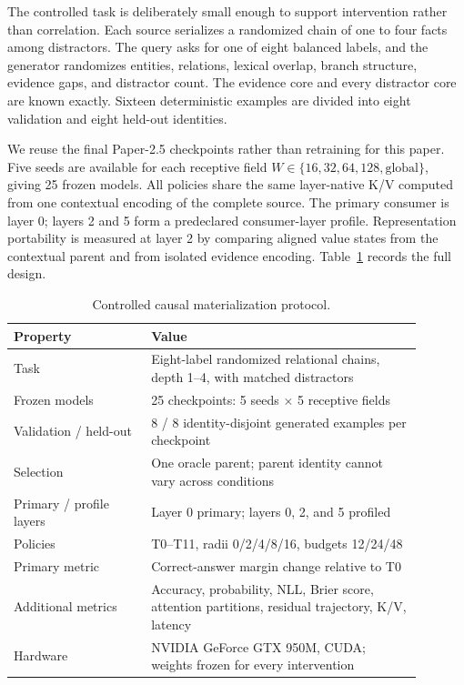 \documentclass[11pt]{article}
\begin{document}
The controlled task is deliberately small enough to support intervention rather than correlation.
Each source serializes a randomized chain of one to four facts among distractors.  The query asks
for one of eight balanced labels, and the generator randomizes entities, relations, lexical
overlap, branch structure, evidence gaps, and distractor count.  The evidence core and every
distractor core are known exactly.  Sixteen deterministic examples are divided into eight
validation and eight held-out identities.

We reuse the final Paper-2.5 checkpoints rather than retraining for this paper.  Five seeds are
available for each receptive field $W\in\{16,32,64,128,\mathrm{global}\}$, giving 25 frozen models.
All policies share the same layer-native K/V computed from one contextual encoding of the complete
source.  The primary consumer is layer 0; layers 2 and 5 form a predeclared consumer-layer profile.
Representation portability is measured at layer 2 by comparing aligned value states from the
contextual parent and from isolated evidence encoding.  Table~\ref{tab:protocol} records the full
design.

\begin{table}[H]
\centering
\caption{Controlled causal materialization protocol.}
\label{tab:protocol}
\small
\begin{tabular}{p{0.30\linewidth}p{0.59\linewidth}}
\toprule
Property & Value \\
\midrule
Task & Eight-label randomized relational chains, depth 1--4, with matched distractors \\
Frozen models & 25 checkpoints: 5 seeds $\times$ 5 receptive fields \\
Validation / held-out & 8 / 8 identity-disjoint generated examples per checkpoint \\
Selection & One oracle parent; parent identity cannot vary across conditions \\
Primary / profile layers & Layer 0 primary; layers 0, 2, and 5 profiled \\
Policies & T0--T11, radii 0/2/4/8/16, budgets 12/24/48 \\
Primary metric & Correct-answer margin change relative to T0 \\
Additional metrics & Accuracy, probability, NLL, Brier score, attention partitions, residual trajectory, K/V, latency \\
Hardware & NVIDIA GeForce GTX 950M, CUDA; weights frozen for every intervention \\
\bottomrule
\end{tabular}
\end{table}
\end{document}

